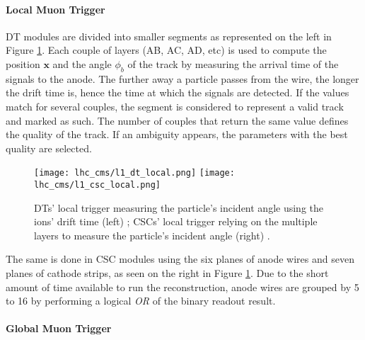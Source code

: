                 \paragraph{Local Muon Trigger}

                    DT modules are divided into smaller segments as represented on the left in Figure \ref{fig:trigger_system_and_reconstruction_algorithms__dt_local}. Each couple of layers (AB, AC, AD, etc) is used to compute the position $ \mathbf{x} $ and the angle $ \phi_b $ of the track by measuring the arrival time of the signals to the anode. The further away a particle passes from the wire, the longer the drift time is, hence the time at which the signals are detected. If the values match for several couples, the segment is considered to represent a valid track and marked as such. The number of couples that return the same value defines the quality of the track. If an ambiguity appears, the parameters with the best quality are selected. \\       

                    \begin{figure}[h!]
                        \centering
                        \texttt{[image: lhc\_cms/l1\_dt\_local.png]}
                        \texttt{[image: lhc\_cms/l1\_csc\_local.png]}
                        \caption{DTs' local trigger measuring the particle's incident angle using the ions' drift time (left) \Cite{CMS_at_LHC}; CSCs' local trigger relying on the multiple layers to measure the particle's incident angle (right) \Cite{Trigger_Muon}.}
                        \label{fig:trigger_system_and_reconstruction_algorithms__dt_local}
                    \end{figure}

                    The same is done in CSC modules using the six planes of anode wires and seven planes of cathode strips, as seen on the right in Figure \ref{fig:trigger_system_and_reconstruction_algorithms__dt_local}. Due to the short amount of time available to run the reconstruction, anode wires are grouped by 5 to 16 by performing a logical \emph{OR} of the binary readout result.

                \paragraph{Global Muon Trigger}

